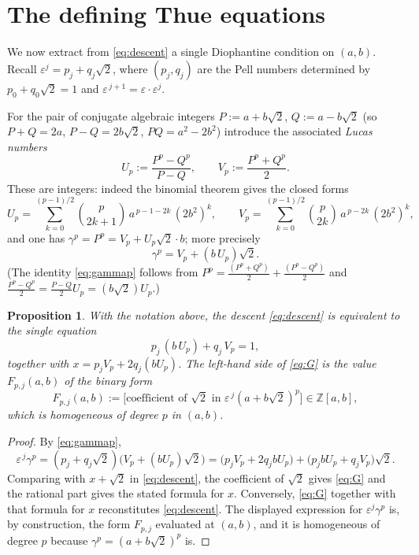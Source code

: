 \documentclass{amsart}
\newtheorem{proposition}{Proposition}
\theoremstyle{definition}
\begin{document}
\section{The defining Thue equations}

We now extract from \eqref{eq:descent} a single Diophantine condition on
$(a,b)$. Recall $\varepsilon^{j}=p_j+q_j\sqrt2$, where $(p_j,q_j)$ are the Pell
numbers determined by $p_0+q_0\sqrt2=1$ and
$\varepsilon^{\,j+1}=\varepsilon\cdot\varepsilon^{j}$.

For the pair of conjugate algebraic integers $P:=a+b\sqrt2$, $Q:=a-b\sqrt2$
(so $P+Q=2a$, $P-Q=2b\sqrt2$, $PQ=a^2-2b^2$) introduce the associated
\emph{Lucas numbers}
\begin{equation}\label{eq:UV}
U_p:=\frac{P^p-Q^p}{P-Q},\qquad V_p:=\frac{P^p+Q^p}{2}.
\end{equation}
These are integers: indeed the binomial theorem gives the closed forms
\begin{equation}\label{eq:Uclosed}
U_p=\sum_{k=0}^{(p-1)/2}\binom{p}{2k+1}\,a^{\,p-1-2k}\,(2b^2)^{k},
\qquad
V_p=\sum_{k=0}^{(p-1)/2}\binom{p}{2k}\,a^{\,p-2k}\,(2b^2)^{k},
\end{equation}
and one has $\gamma^{p}=P^{p}=V_p+U_p\sqrt2\cdot b$; more precisely
\begin{equation}\label{eq:gammap}
\gamma^{p}=V_p+(b\,U_p)\sqrt2 .
\end{equation}
(The identity \eqref{eq:gammap} follows from $P^p=\tfrac{(P^p+Q^p)}2+\tfrac{(P^p-Q^p)}2$
and $\tfrac{P^p-Q^p}{2}=\tfrac{P-Q}{2}U_p=(b\sqrt2)U_p$.)

\begin{proposition}\label{prop:thue}
With the notation above, the descent \eqref{eq:descent} is equivalent to the
single equation
\begin{equation}\label{eq:G}
p_j\,(b\,U_p)+q_j\,V_p=1 ,
\end{equation}
together with $x=p_j V_p+2q_j (bU_p)$. The left-hand side of \eqref{eq:G} is the
value $F_{p,j}(a,b)$ of the binary form
\begin{equation}\label{eq:form}
F_{p,j}(a,b):=\Big[\text{coefficient of }\sqrt2\text{ in }
\varepsilon^{\,j}(a+b\sqrt2)^{p}\Big]\in\mathbb Z[a,b],
\end{equation}
which is homogeneous of degree $p$ in $(a,b)$.
\end{proposition}

\begin{proof}
By \eqref{eq:gammap},
\[
\varepsilon^{\,j}\gamma^{p}=(p_j+q_j\sqrt2)\big(V_p+(bU_p)\sqrt2\big)
=\big(p_jV_p+2q_j bU_p\big)+\big(p_j bU_p+q_j V_p\big)\sqrt2 .
\]
Comparing with $x+\sqrt2$ in \eqref{eq:descent}, the coefficient of $\sqrt2$
gives \eqref{eq:G} and the rational part gives the stated formula for $x$.
Conversely, \eqref{eq:G} together with that formula for $x$ reconstitutes
\eqref{eq:descent}. The displayed expression for $\varepsilon^{j}\gamma^{p}$ is,
by construction, the form $F_{p,j}$ evaluated at $(a,b)$, and it is homogeneous
of degree $p$ because $\gamma^{p}=(a+b\sqrt2)^p$ is.
\end{proof}
\end{document}
